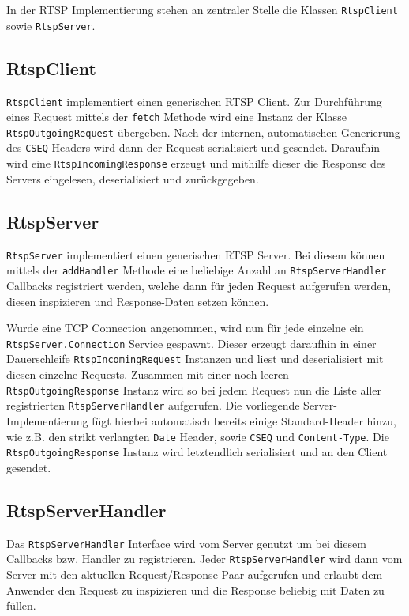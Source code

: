 \documentclass[a4paper,12pt]{article}
\begin{document}
In der RTSP \cite{RFC2326} Implementierung stehen an zentraler Stelle die Klassen \texttt{RtspClient} sowie \texttt{RtspServer}.

\subsection{RtspClient}

\texttt{RtspClient} implementiert einen generischen RTSP Client.
Zur Durchführung eines Request mittels der \texttt{fetch} Methode wird eine Instanz der Klasse \texttt{RtspOutgoingRequest} übergeben.
Nach der internen, automatischen Generierung des \texttt{CSEQ} Headers wird dann der Request serialisiert und gesendet.
Daraufhin wird eine \texttt{RtspIncomingResponse} erzeugt und mithilfe dieser die Response des Servers eingelesen, deserialisiert und zurückgegeben.

\subsection{RtspServer}

\texttt{RtspServer} implementiert einen generischen RTSP Server.
Bei diesem können mittels der \texttt{addHandler} Methode eine beliebige Anzahl an \texttt{RtspServerHandler} Callbacks registriert werden, welche dann für jeden Request aufgerufen werden, diesen inspizieren und Response-Daten setzen können.

Wurde eine TCP Connection angenommen, wird nun für jede einzelne ein \texttt{RtspServer.Connection} Service gespawnt.
Dieser erzeugt daraufhin in einer Dauerschleife \texttt{RtspIncomingRequest} Instanzen und liest und deserialisiert mit diesen einzelne Requests.
Zusammen mit einer noch leeren \texttt{RtspOutgoingResponse} Instanz wird so bei jedem Request nun die Liste aller registrierten \texttt{RtspServerHandler} aufgerufen.
Die vorliegende Server-Implementierung fügt hierbei automatisch bereits einige Standard-Header hinzu, wie z.B. den strikt verlangten \texttt{Date} Header, sowie \texttt{CSEQ} und \texttt{Content-Type}.
Die \texttt{RtspOutgoingResponse} Instanz wird letztendlich serialisiert und an den Client gesendet.

\subsection{RtspServerHandler}

Das \texttt{RtspServerHandler} Interface wird vom Server genutzt um bei diesem Callbacks bzw. Handler zu registrieren.
Jeder \texttt{RtspServerHandler} wird dann vom Server mit den aktuellen Request/Response-Paar aufgerufen und erlaubt dem Anwender den Request zu inspizieren und die Response beliebig mit Daten zu füllen.
\end{document}
